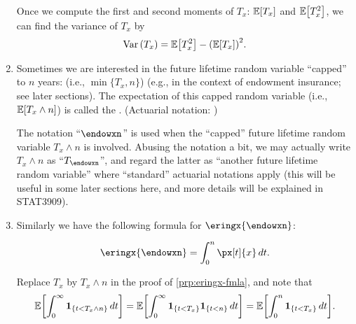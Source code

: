 \begin{enumerate}
Once we compute the first and second moments of \(T_x\): \(\mathbb{E}\qty[T_x]\) and
\(\mathbb{E}\qty[T_x^2]\), we can find the variance of \(T_x\) by
\[
\operatorname{Var}\qty(T_x)=\mathbb{E}\qty[T_x^2]-\qty(\mathbb{E}\qty[T_x])^2.
\]

\item Sometimes we are interested in the future lifetime random variable
``capped'' to \(n\) years:  (i.e., \(\min\{T_x, n\}\)) (e.g., in
the context of endowment insurance; see later sections). The expectation of
this capped random variable (i.e., \(\mathbb{E}\qty[T_x\wedge n]\)) is called the
. (Actuarial notation:
)

\begin{note}
The notation ``\(\endowxn\)'' is used when the ``capped'' future lifetime
random variable \(T_x\wedge n\) is involved. Abusing the notation a bit, we may
actually write \(T_x\wedge n\) as ``\(T_{\endowxn}\)'', and regard the latter
as ``another future lifetime random variable'' where ``standard'' actuarial
notations apply (this will be useful in some later sections here, and more
details will be explained in STAT3909).
\end{note}

\item Similarly we have the following formula for \(\eringx{\endowxn}\):
\begin{proposition}
\label{prp:eringxn-fmla}
\[
\eringx{\endowxn}=\int_{0}^{n}\px[t]{x}\,dt.
\]
\end{proposition}
\begin{pf}
Replace \(T_x\) by \(T_x\wedge n\) in the proof of \cref{prp:eringx-fmla}, and note that
\[
\mathbb{E}\qty[\int_{0}^{\infty}\mathbf{1}_{\left\{t<T_x\wedge n\right\}}\,dt]
=\mathbb{E}\qty[\int_{0}^{\infty}\mathbf{1}_{\left\{t<T_x\right\}}\mathbf{1}_{\left\{t<n\right\}}\,dt]
=\mathbb{E}\qty[\int_{0}^{n}\mathbf{1}_{\left\{t<T_x\right\}}\,dt].
\]
\end{pf}
\end{enumerate}
